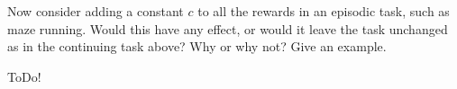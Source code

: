 
\begin{exercise}[Exercise 3.16]

Now consider adding a constant $c$ to all the rewards in an episodic task, such as maze running.
Would this have any effect, or would it leave the task unchanged as in the continuing task above?
Why or why not?
Give an example.    

\end{exercise}


\begin{solution}

ToDo!

\end{solution}

